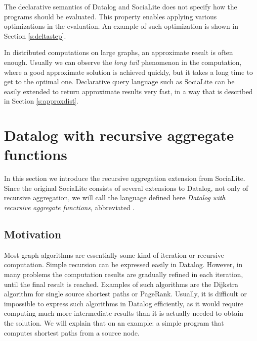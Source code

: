 The declarative semantics of Datalog and SociaLite does not specify how the programs should be evaluated. This property enables applying various optimizations in the evaluation. An example of such optimization is shown in Section \ref{s:deltastep}.  


In distributed computations on large graphs, an approximate result is often enough. Usually we can observe the \emph{long tail} phenomenon in the computation, where a good approximate solution is achieved quickly, but it takes a long time to get to the optimal one. Declarative query language such as SociaLite can be easily extended to return approximate results very fast, in a way that is described in Section \ref{s:approxdist}.


\section{Datalog with recursive aggregate functions}\label{s:recaggr}

In this section we introduce the recursive aggregation extension from SociaLite. Since the original SociaLite consists of several extensions to Datalog, not only of recursive aggregation, we will call the language defined here \emph{Datalog with recursive aggregate functions}, abbreviated \datalogra.

\subsection{Motivation}
Most graph algorithms are essentially some kind of iteration or recursive computation. Simple recursion can be expressed easily in Datalog. However, in many problems the computation results are gradually refined in each iteration, until the final result is reached. Examples of such algorithms are the Dijkstra algorithm for single source shortest paths or PageRank. Usually, it is difficult or impossible to express such algorithms in Datalog efficiently, as it would require computing much more intermediate results than it is actually needed to obtain the solution. We will explain that on an example: a simple program that computes shortest paths from a source node.

